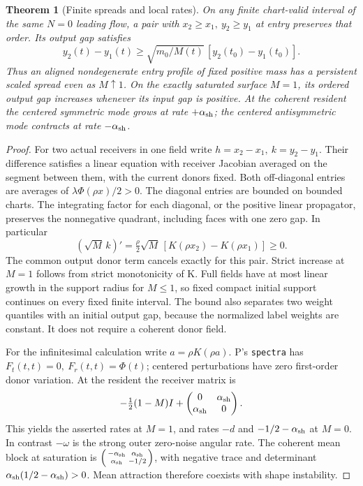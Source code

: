 \documentclass[11pt]{article}
\newtheorem{theorem}{Theorem}\newtheorem{lemma}{Lemma}
\begin{document}
\begin{theorem}[Finite spreads and local rates]\label{an04cfsv1:spread}
On any finite chart-valid interval of the same \(N=0\) leading flow,
a pair with \(x_2\ge x_1,\ y_2\ge y_1\) at entry preserves that order.
Its output gap satisfies
\[
 y_2(t)-y_1(t)\ge\sqrt{m_0/M(t)}\,[y_2(t_0)-y_1(t_0)] .
\]
Thus an aligned nondegenerate entry profile of fixed positive mass
has a persistent scaled spread even as \(M\uparrow1\). On the exactly
saturated surface \(M=1\), its ordered output gap increases whenever
its input gap is positive. At the coherent resident the centered
symmetric mode grows at rate \(+\alpha_{\rm sh}\); the centered
antisymmetric mode contracts at rate \(-\alpha_{\rm sh}\).
\end{theorem}
\begin{proof}
For two actual receivers in one field write \(h=x_2-x_1,\ k=y_2-y_1\).
Their difference satisfies a linear equation with receiver Jacobian
averaged on the segment between them, with the current donors fixed.
Both off-diagonal entries are averages of \(\lambda\Phi(\rho x)/2>0\).
The diagonal entries are bounded on bounded charts. The integrating
factor for each diagonal, or the positive linear propagator, preserves
the nonnegative quadrant, including faces with one zero gap.
In particular
\[
 (\sqrt M\,k)'=\tfrac{\rho}{2}\sqrt M\,[K(\rho x_2)-K(\rho x_1)]\ge0 .
\]
The common output donor term cancels exactly for this pair.
Strict increase at \(M=1\) follows from strict monotonicity of K.
Full fields have at most linear growth in the support radius for
\(M\le1\), so fixed compact initial support continues on every fixed
finite interval. The bound also separates two weight quantiles with
an initial output gap, because the normalized label weights are
constant. It does not require a coherent donor field.

For the infinitesimal calculation write \(a=\rho K(\rho a)\).
P's \texttt{spectra} has \(F_t(t,t)=0,\ F_r(t,t)=\Phi(t)\);
centered perturbations have zero first-order donor variation. At
the resident the receiver matrix is
\[
 -\tfrac12(1-M)I+
 \begin{pmatrix}0&\alpha_{\rm sh}\\ \alpha_{\rm sh}&0\end{pmatrix}.
\]
This yields the asserted rates at \(M=1\), and rates \(-d\) and
\(-1/2-\alpha_{\rm sh}\) at \(M=0\). In contrast \(-\omega\)
is the strong outer zero-noise angular rate. The coherent mean block
at saturation is
\(\left(\begin{smallmatrix}-\alpha_{\rm sh}&\alpha_{\rm sh}\\
\alpha_{\rm sh}&-1/2\end{smallmatrix}\right)\), with negative trace
and determinant \(\alpha_{\rm sh}(1/2-\alpha_{\rm sh})>0\).
Mean attraction therefore coexists with shape instability.
\end{proof}
\end{document}
